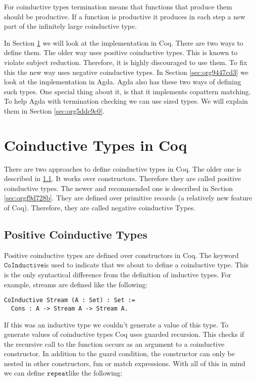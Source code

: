 \documentclass[a4paper,cleardoubleempty,BCOR1cm]{scrbook}
\begin{document}
For coinductive types termination means that functions that produce them
should be productive. If a function is productive it produces in each step a
new part of the infinitely large coinductive type.

In Section \ref{sec:org5d9a58e} we will look at the implementation in Coq.
There are two ways to define them. The older way uses positive coinductive
types. This is known to violate subject reduction. Therefore, it is highly
discouraged to use them. To fix this the new way uses negative coinductive
types. In Section \ref{sec:org9447cd3} we look at the implementation in
Agda. Agda also has these two ways of defining such types. One special thing
about it, is that it implements copattern matching. To help Agda with
termination checking we can use sized types.  We will explain them in Section
\ref{sec:org5ddc9c0}.
\section{Coinductive Types in Coq}
\label{sec:org5d9a58e}
There are two approaches to define coinductive types in Coq. The older one is
described in \ref{sec:org1db9e9e}. It works over constructors. Therefore
they are called positive coinductive types. The newer and recommended one is
described in Section \ref{sec:orgf9d728b}. They are defined over
primitive records (a relatively new feature of Coq). Therefore, they are
called negative coinductive Types.

\subsection{Positive Coinductive Types}
\label{sec:org1db9e9e}
Positive coinductive types are defined over constructors in Coq.  The keyword
\linebreak $\mathtt{CoInductive}$\;is used to indicate that we about to define a coinductive type.
This is the only syntactical difference from the definition of inductive
types. For example, streams are defined like the following:

\begin{verbatim}
CoInductive Stream (A : Set) : Set :=
  Cons : A -> Stream A -> Stream A.
\end{verbatim}

If this was an inductive type we couldn't generate a value of this type. To
generate values of coinductive types Coq uses guarded recursion. This checks
if the recursive call to the function occurs as an argument to a coinductive
constructor. In addition to the guard condition, the constructor can only be
nested in other constructors, fun or match expressions. With all of this in
mind we can define $\mathtt{repeat}$\;like the following:
\end{document}

